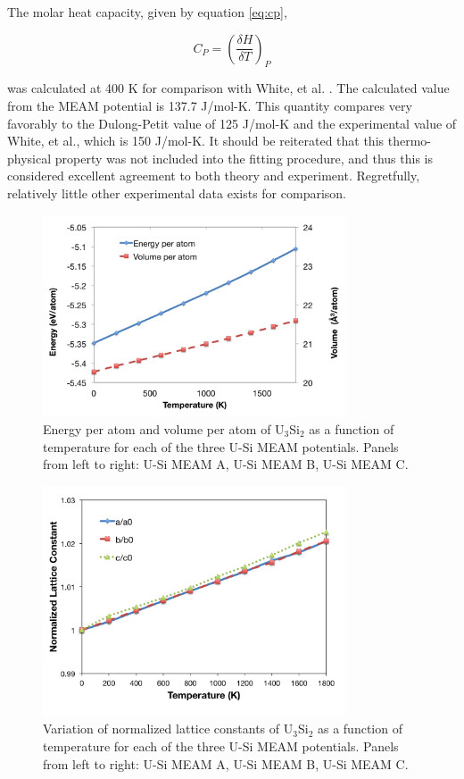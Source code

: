 \documentclass[review]{elsarticle}
\begin{document}
The molar heat capacity, given by equation \ref{eq:cp}, 

\begin{equation}
\label{eq:cp}
C_{P} = \left(\frac{\delta H}{\delta T}\right)_{P}
\end{equation}

was calculated at 400 K for comparison with White, et al. \cite{white2015}.  The calculated value from the MEAM potential is 137.7 J/mol-K.  This quantity compares very favorably to the Dulong-Petit value of 125 J/mol-K and the experimental value of White, et al., which is 150 J/mol-K.  It should be reiterated that this thermo-physical property was not included into the fitting procedure, and thus this is considered excellent agreement to both theory and experiment.  Regretfully, relatively little other experimental data exists for comparison.  

 \begin{figure}[hbt]
	\centering
	\includegraphics[width=0.8\textwidth]{tempKK1.png}
    \caption{Energy per atom and volume per atom of U$_{3}$Si$_{2}$ as a function of temperature for each of the three U-Si MEAM potentials.  Panels from left to right: U-Si MEAM A, U-Si MEAM B, U-Si MEAM C.}\label{fig:temp}
\end{figure}

\begin{figure}[hbt]
	\centering
	\includegraphics[width=0.8\textwidth]{latticeKK1.png}
    \caption{Variation of normalized lattice constants of U$_{3}$Si$_{2}$ as a function of temperature for each of the three U-Si MEAM potentials.  Panels from left to right: U-Si MEAM A, U-Si MEAM B, U-Si MEAM C.}\label{fig:latticetemp}
\end{figure}
\end{document}
